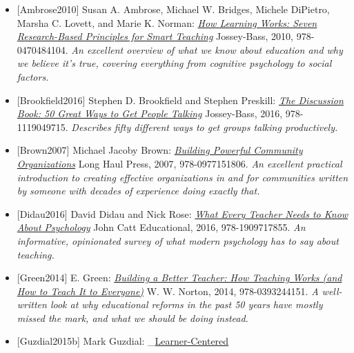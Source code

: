 \documentclass[10pt,statementpaper]{memoir}
\begin{document}
\begin{itemize}
\item
  \protect\hypertarget{ambrose-hlw}{}{{[}Ambrose2010{]}} Susan A.
  Ambrose, Michael W. Bridges, Michele DiPietro, Marsha C. Lovett, and
  Marie K. Norman:
  \emph{\href{https://www.amazon.com/How-Learning-Works-Research-Based-Principles/dp/0470484101/}{How
  Learning Works: Seven Research-Based Principles for Smart Teaching}}
  Jossey-Bass, 2010, 978-0470484104. \emph{An excellent overview of what
  we know about education and why we believe it's true, covering
  everything from cognitive psychology to social factors.}
\item
  \protect\hypertarget{brookfield-discussion}{}{{[}Brookfield2016{]}}
  Stephen D. Brookfield and Stephen Preskill:
  \emph{\href{https://www.amazon.com/Discussion-Book-Great-People-Talking/dp/1119049717/}{The
  Discussion Book: 50 Great Ways to Get People Talking}} Jossey-Bass,
  2016, 978-1119049715. \emph{Describes fifty different ways to get
  groups talking productively.}
\item
  \protect\hypertarget{brown-bpco}{}{{[}Brown2007{]}} Michael Jacoby
  Brown:
  \emph{\href{https://www.amazon.com/Building-Powerful-Community-Organizations-Personal/dp/0977151808/}{Building
  Powerful Community Organizations}} Long Haul Press, 2007,
  978-0977151806. \emph{An excellent practical introduction to creating
  effective organizations in and for communities written by someone with
  decades of experience doing exactly that.}
\item
  \protect\hypertarget{didau-teachers-psych}{}{{[}Didau2016{]}} David
  Didau and Nick Rose:
  \emph{\href{https://www.amazon.com/Every-Teacher-Needs-About-Psychology/dp/1909717851/}{What
  Every Teacher Needs to Know About Psychology}} John Catt Educational,
  2016, 978-1909717855. \emph{An informative, opinionated survey of what
  modern psychology has to say about teaching.}
\item
  \protect\hypertarget{green-babt}{}{{[}Green2014{]}} E. Green:
  \emph{\href{https://www.amazon.com/Building-Better-Teacher-Teaching-Everyone/dp/0393351084/}{Building
  a Better Teacher: How Teaching Works (and How to Teach It to
  Everyone)}} W. W. Norton, 2014, 978-0393244151. \emph{A well-written
  look at why educational reforms in the past 50 years have mostly
  missed the mark, and what we should be doing instead.}
\item
  \protect\hypertarget{guzdial-lcd}{}{{[}Guzdial2015b{]}} Mark Guzdial:
  \_\href{https://www.amazon.com/Learner-Centered-Design-Computing-Education-Human-Centered/dp/1627053514/}{Learner-Centered
}
\end{itemize}
\end{document}
